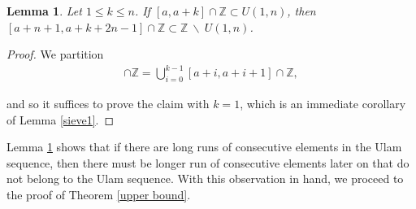 \documentclass{amsart}
\newcommand{\ZZ}{\mathbb{Z}}
\theoremstyle{theorem}
\newtheorem{lemma}{Lemma}[section]
\theoremstyle{definition}
\begin{document}
\begin{lemma}\label{sieve2}
Let $1 \leq k \leq n$. If $[a,a + k] \cap \ZZ \subset U(1,n)$, then $[a + n + 1, a + k + 2n - 1] \cap \ZZ \subset \ZZ \ \backslash \ U(1,n)$.
\end{lemma}
\begin{proof}
We partition
\begin{align*}
[a,a+k] \cap \ZZ = \bigcup\limits_{i=0}^{k-1} [a+i, a+i+1] \cap \ZZ,
\end{align*}

\noindent and so it suffices to prove the claim with $k = 1$, which is an immediate corollary of Lemma \ref{sieve1}.
\end{proof}

Lemma \ref{sieve2} shows that if there are long runs of consecutive elements in the Ulam sequence, then there must be longer run of consecutive elements later on that do not belong to the Ulam sequence. With this observation in hand, we proceed to the proof of Theorem \ref{upper bound}.
\end{document}
